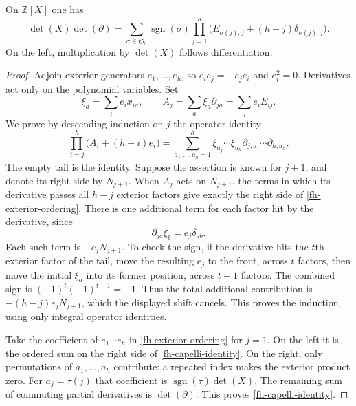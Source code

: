 \begin{lemma}\label{fh-capelli}
On $\mathbb Z[X]$ one has
\begin{equation}\label{fh-capelli-identity}
 \det(X)\det(\partial)=
 \sum_{\sigma\in\mathfrak S_h}\operatorname{sgn}(\sigma)
       \prod_{j=1}^h
           \bigl(E_{\sigma(j),j}+(h-j)\delta_{\sigma(j),j}\bigr).
\end{equation}
On the left, multiplication by $\det(X)$ follows differentiation.
\end{lemma}
\begin{proof}
Adjoin exterior generators $e_1,\ldots,e_h$, so
$e_ie_j=-e_je_i$ and $e_i^2=0$. Derivatives act only on the
polynomial variables. Set
\[
       \xi_a=\sum_i e_i x_{ia},\qquad
       A_j=\sum_a\xi_a\partial_{ja}=\sum_i e_iE_{ij}.
\]
We prove by descending induction on $j$ the operator identity
\begin{equation}\label{fh-exterior-ordering}
 \prod_{i=j}^h\bigl(A_i+(h-i)e_i\bigr)
   =\sum_{a_j,\ldots,a_h=1}^h
        \xi_{a_j}\cdots\xi_{a_h}
        \partial_{j,a_j}\cdots\partial_{h,a_h}.
\end{equation}
The empty tail is the identity. Suppose the assertion is known
for $j+1$, and denote its right side by $N_{j+1}$.
When $A_j$ acts on $N_{j+1}$, the terms in which its derivative
passes all $h-j$ exterior factors give exactly the right side
of \eqref{fh-exterior-ordering}. There is one additional term
for each factor hit by the derivative, since
\[
                         \partial_{ja}\xi_b=e_j\delta_{ab}.
\]
Each such term is $-e_jN_{j+1}$. To check the sign, if the
derivative hits the $t$th exterior factor of the tail, move the
resulting $e_j$ to the front, across $t$ factors, then move the
initial $\xi_a$ into its former position, across $t-1$ factors.
The combined sign is $(-1)^t(-1)^{t-1}=-1$.
Thus the total additional contribution is
$-(h-j)e_jN_{j+1}$, which the displayed shift cancels.
This proves the induction, using only integral operator identities.

Take the coefficient of $e_1\cdots e_h$ in
\eqref{fh-exterior-ordering} for $j=1$.
On the left it is the ordered sum on the right side of
\eqref{fh-capelli-identity}. On the right, only permutations of
$a_1,\ldots,a_h$ contribute: a repeated index makes the exterior
product zero. For $a_j=\tau(j)$ that coefficient is
$\operatorname{sgn}(\tau)\det(X)$.
The remaining sum of commuting partial derivatives is
$\det(\partial)$. This proves \eqref{fh-capelli-identity}.
\end{proof}

